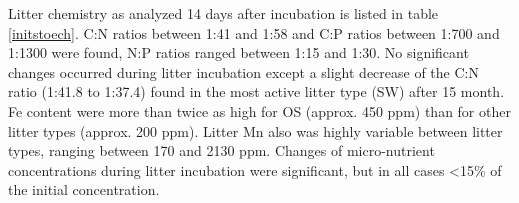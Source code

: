 \documentclass[authoryear,preprint,review,12pt]{elsarticle}
\begin{document}
                                                                                                                                                                                                                                                                                                                                                                                                                                                                                                                                                                                                                                                                                                                                                                                                                                                                                                                                                                                                                                                                                                                                                                                                                                                                                                                                                                                                                                                                                                                                        Litter chemistry as analyzed 14 days after incubation is listed in table \ref{initstoech}. C:N ratios between 1:41 and 1:58 and C:P ratios between 1:700 and 1:1300 were found, N:P ratios ranged between 1:15 and 1:30. No significant changes occurred during litter incubation except a slight decrease of the C:N ratio (1:41.8 to 1:37.4) found in the most active litter type (SW) after 15 month. Fe content were more than twice as high for OS (approx. 450 ppm) than for other litter types (approx. 200 ppm). Litter Mn also was highly variable between litter types, ranging between 170 and 2130 ppm. Changes of micro-nutrient concentrations during litter incubation were significant, but in all cases \textless 15\% of the initial concentration.
\end{document}
